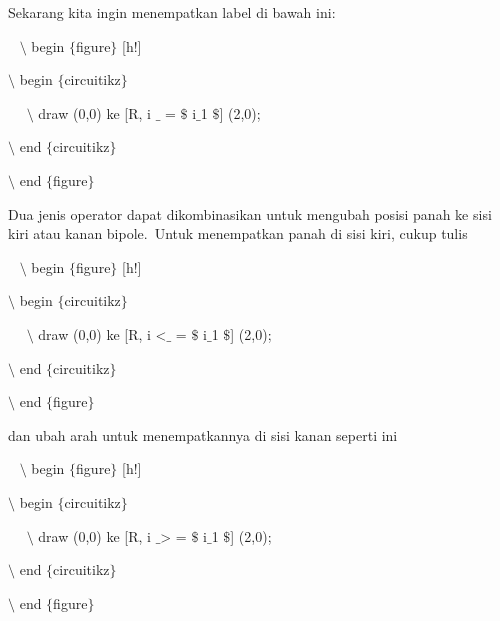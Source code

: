 \noindent 
Sekarang kita ingin menempatkan label di bawah ini:
\par


\noindent 
~ $\setminus$ begin $ \{ $figure$ \} $ [h!]
\par


\noindent 
 $\setminus$ begin $ \{ $circuitikz$ \} $
\par


\noindent 
~~ $\setminus$ draw (0,0) ke [R, i $ \_ $ = $\$$ i$ \_ $1 $\$$] (2,0);
\par


\noindent 
 $\setminus$ end $ \{ $circuitikz$ \} $
\par


\noindent 
 $\setminus$ end $ \{ $figure$ \} $ 
\par


\noindent 
Dua jenis operator dapat dikombinasikan untuk mengubah posisi panah ke sisi kiri atau kanan bipole. Untuk menempatkan panah di sisi kiri, cukup tulis
\par


\noindent 
~ $\setminus$ begin $ \{ $figure$ \} $ [h!]
\par


\noindent 
 $\setminus$ begin $ \{ $circuitikz$ \} $
\par


\noindent 
~~ $\setminus$ draw (0,0) ke [R, i <$ \_ $ = $\$$ i$ \_ $1 $\$$] (2,0);
\par


\noindent 
 $\setminus$ end $ \{ $circuitikz$ \} $
\par


\noindent 
 $\setminus$ end $ \{ $figure$ \} $ 
\par


\noindent 
dan ubah arah untuk menempatkannya di sisi kanan seperti ini
\par


\noindent 
~ $\setminus$ begin $ \{ $figure$ \} $ [h!]
\par


\noindent 
 $\setminus$ begin $ \{ $circuitikz$ \} $
\par


\noindent 
~~ $\setminus$ draw (0,0) ke [R, i $ \_ $> = $\$$ i$ \_ $1 $\$$] (2,0);
\par


\noindent 
 $\setminus$ end $ \{ $circuitikz$ \} $
\par


\noindent 
 $\setminus$ end $ \{ $figure$ \} $ 
\par


